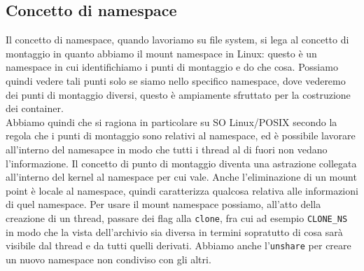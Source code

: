 \documentclass[12pt, oneside]{extbook}
\begin{document}
\subsection{Concetto di namespace}
Il concetto di namespace, quando lavoriamo su file system, si lega al concetto di montaggio in quanto abbiamo il mount namespace in Linux: questo è un namespace in cui identifichiamo i punti di montaggio e do che cosa. Possiamo quindi vedere tali punti solo se siamo nello specifico namespace, dove vederemo dei punti di montaggio diversi, questo è ampiamente sfruttato per la costruzione dei container.\\Abbiamo quindi che si ragiona in particolare su SO Linux/POSIX secondo la regola che i punti di montaggio sono relativi al namespace, ed è possibile lavorare all'interno del namesapce in modo che tutti i thread al di fuori non vedano l'informazione. Il concetto di punto di montaggio diventa una astrazione collegata all'interno del kernel al namespace per cui vale. Anche l'eliminazione di un mount point è locale al namespace, quindi caratterizza qualcosa relativa alle informazioni di quel namespace. Per usare il mount namespace possiamo, all'atto della creazione di un thread, passare dei flag alla \texttt{clone}, fra cui ad esempio \texttt{CLONE\_NS} in modo che la vista dell'archivio sia diversa in termini sopratutto di cosa sarà visibile dal thread e da tutti quelli derivati. Abbiamo anche l'\texttt{unshare} per creare un nuovo namespace non condiviso con gli altri.
\end{document}
